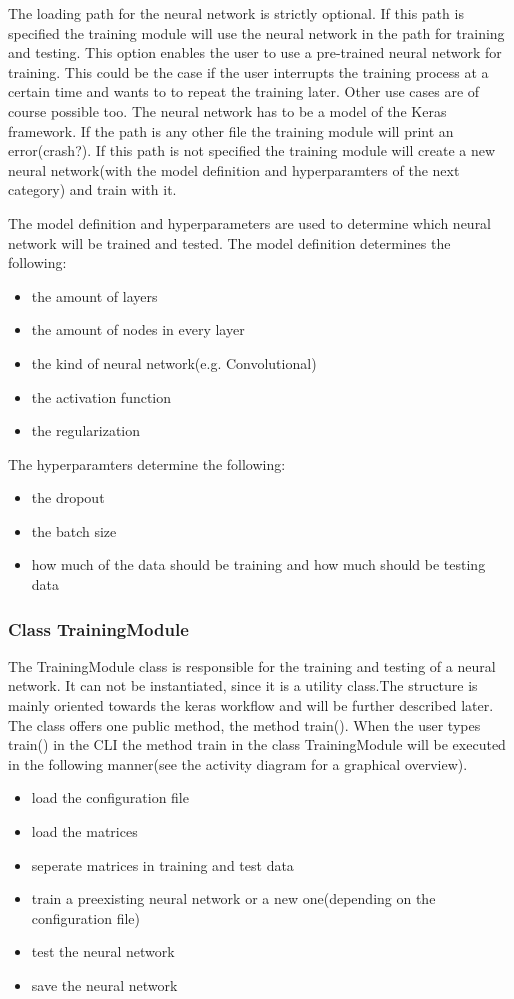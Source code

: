 \documentclass[parskip=full]{scrartcl}
\begin{document}
The loading path for the neural network is strictly optional. If this path is specified the training module will use the neural network in the path for training and testing. This option enables the user to use a pre-trained neural network for training. This could be the case if the user interrupts the training process at a certain time and wants to to repeat the training later. Other use cases are of course possible too. The neural network has to be a model of the Keras framework. If the path is any other file the training module will print an error(crash?). If this path is not specified the training module will create a new neural network(with the model definition and hyperparamters of the next category) and train with it. \newline

The model definition and hyperparameters are used to determine which neural network will be trained and tested. The model definition determines the following:
\begin{itemize}
\item the amount of layers
\item the amount of nodes in every layer
\item the kind of neural network(e.g. Convolutional)
\item the activation function
\item the regularization
\end{itemize}

The hyperparamters determine the following:

\begin{itemize}
\item the dropout
\item the batch size
\item how much of the data should be training and how much should be testing data
\end{itemize}

\subsubsection{Class TrainingModule}
The TrainingModule class is responsible for the training and testing of a neural network. It can not be instantiated, since it is a utility class.The structure is mainly oriented towards the keras workflow and will be further described later. The class offers one public method, the method train(). \newline
When the user types train() in the CLI the method train in the class TrainingModule will be executed in the following manner(see the activity diagram for a graphical overview).
\begin{itemize}
\item load the configuration file
\item load the matrices
\item seperate matrices in training and test data
\item train a preexisting neural network or a new one(depending on the configuration file)
\item test the neural network
\item save the neural network
\end{itemize}
\end{document}
